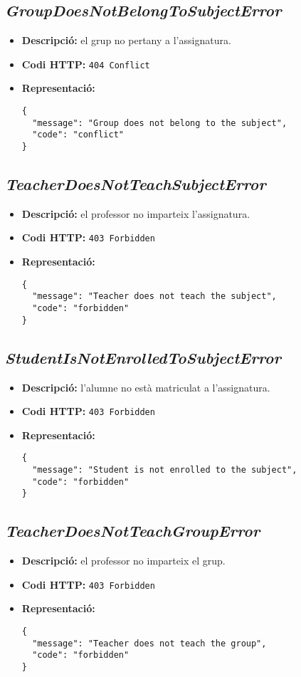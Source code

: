 \subsection{\emph{GroupDoesNotBelongToSubjectError}}
\begin{itemize}
	\item \textbf{Descripció:} el grup no pertany a l'assignatura.
	\item \textbf{Codi \ac{HTTP}:} \texttt{404 Conflict}
	\item \textbf{Representació:}
\begin{verbatim}
{
  "message": "Group does not belong to the subject",
  "code": "conflict"
}
\end{verbatim}
\end{itemize}
\subsection{\emph{TeacherDoesNotTeachSubjectError}}
\begin{itemize}
	\item \textbf{Descripció:} el professor no imparteix l'assignatura.
	\item \textbf{Codi \ac{HTTP}:} \texttt{403 Forbidden}
	\item \textbf{Representació:}
\begin{verbatim}
{
  "message": "Teacher does not teach the subject",
  "code": "forbidden"
}
\end{verbatim}
\end{itemize}
\subsection{\emph{StudentIsNotEnrolledToSubjectError}}
\begin{itemize}
	\item \textbf{Descripció:} l'alumne no està matriculat a l'assignatura.
	\item \textbf{Codi \ac{HTTP}:} \texttt{403 Forbidden}
	\item \textbf{Representació:}
\begin{verbatim}
{
  "message": "Student is not enrolled to the subject",
  "code": "forbidden"
}
\end{verbatim}
\end{itemize}

\subsection{\emph{TeacherDoesNotTeachGroupError}}
\begin{itemize}
	\item \textbf{Descripció:} el professor no imparteix el grup.
	\item \textbf{Codi \ac{HTTP}:} \texttt{403 Forbidden}
	\item \textbf{Representació:}
\begin{verbatim}
{
  "message": "Teacher does not teach the group",
  "code": "forbidden"
}
\end{verbatim}
\end{itemize}
